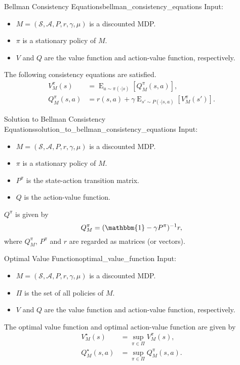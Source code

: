\documentclass{article}
\begin{document}
\begin{lemma}{Bellman Consistency Equations}{bellman_consistency_equations}
    Input:
    \begin{itemize}
        \item $M=(\mathcal{S}, \mathcal{A}, P, r, \gamma, \mu)$ is a discounted MDP.
        \item $\pi$ is a stationary policy of $M$.
        \item $V$ and $Q$ are the value function and action-value function, respectively.
    \end{itemize}
    The following consistency equations are satisfied.
    \begin{align*}
        V^\pi_M(s) &= \operatorname{E}_{a\sim \pi(\cdot|s)}[Q^\pi_M(s,a)], \\
        Q^\pi_M(s,a) &= r(s,a) + \gamma \operatorname{E}_{s'\sim P(\cdot|s,a)}[V^\pi_M(s')].
    \end{align*}
\end{lemma}

\begin{corollary}{Solution to Bellman Consistency Equations}{solution_to_bellman_consistency_equations}
    Input:
    \begin{itemize}
        \item $M=(\mathcal{S}, \mathcal{A}, P, r, \gamma, \mu)$ is a discounted MDP.
        \item $\pi$ is a stationary policy of $M$.
        \item $P^\pi$ is the state-action transition matrix.
        \item $Q$ is the action-value function.
    \end{itemize}
    $Q^\pi$ is given by
    \[ Q^\pi_M = (\mathbbm{1} - \gamma P^\pi)^{-1}r, \]
    where $Q^\pi_M$, $P^\pi$ and $r$ are regarded as matrices (or vectors).
\end{corollary}

\begin{definition}{Optimal Value Function}{optimal_value_function}
    Input:
    \begin{itemize}
        \item $M=(\mathcal{S}, \mathcal{A}, P, r, \gamma, \mu)$ is a discounted MDP.
        \item $\Pi$ is the set of all policies of $M$.
        \item $V$ and $Q$ are the value function and action-value function, respectively.
    \end{itemize}
    The optimal value function and optimal action-value function are given by
    \begin{align*}
        V_M^{\star}(s) &= \sup_{\pi\in\Pi} V^\pi_M(s), \\
        Q_M^{\star}(s,a) &= \sup_{\pi\in\Pi} Q^\pi_M(s,a).
    \end{align*}
\end{definition}
\end{document}
